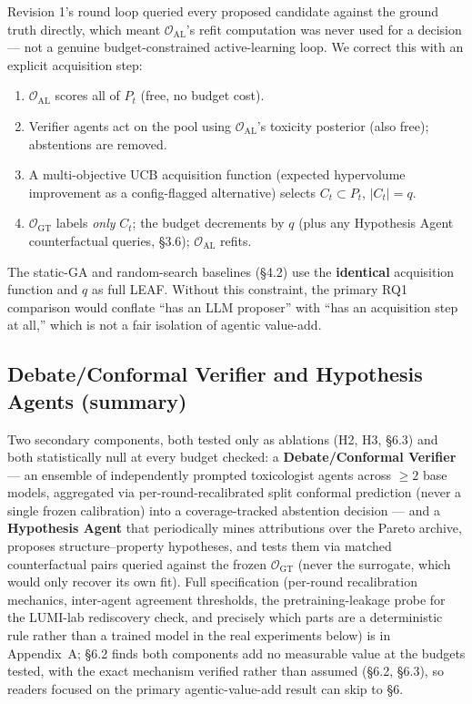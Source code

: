 \documentclass{article}
\begin{document}
Revision 1's round loop queried every proposed candidate against the
ground truth directly, which meant $\mathcal{O}_{\text{AL}}$'s refit
computation was never used for a decision --- not a genuine
budget-constrained active-learning loop. We correct this with an explicit
acquisition step:
\begin{enumerate}
\item $\mathcal{O}_{\text{AL}}$ scores all of $P_t$ (free, no budget cost).
\item Verifier agents act on the pool using $\mathcal{O}_{\text{AL}}$'s
toxicity posterior (also free); abstentions are removed.
\item A multi-objective UCB acquisition function (expected hypervolume
improvement as a config-flagged alternative) selects $C_t \subset P_t$,
$|C_t| = q$.
\item $\mathcal{O}_{\text{GT}}$ labels \emph{only} $C_t$; the budget
decrements by $q$ (plus any Hypothesis Agent counterfactual queries, \S3.6);
$\mathcal{O}_{\text{AL}}$ refits.
\end{enumerate}
The static-GA and random-search baselines (\S4.2) use the
\textbf{identical} acquisition function and $q$ as full LEAF. Without this
constraint, the primary RQ1 comparison would conflate ``has an LLM
proposer'' with ``has an acquisition step at all,'' which is not a fair
isolation of agentic value-add.

\subsection{Debate/Conformal Verifier and Hypothesis Agents (summary)}

Two secondary components, both tested only as ablations (H2, H3, \S6.3)
and both statistically null at every budget checked: a
\textbf{Debate/Conformal Verifier} --- an ensemble of independently
prompted toxicologist agents across $\ge2$ base models, aggregated via
per-round-recalibrated split conformal prediction (never a single frozen
calibration) into a coverage-tracked abstention decision --- and a
\textbf{Hypothesis Agent} that periodically mines attributions over the
Pareto archive, proposes structure--property hypotheses, and tests them
via matched counterfactual pairs queried against the frozen
$\mathcal{O}_{\text{GT}}$ (never the surrogate, which would only recover
its own fit). Full specification (per-round recalibration mechanics,
inter-agent agreement thresholds, the pretraining-leakage probe for the
LUMI-lab rediscovery check, and precisely which parts are a deterministic
rule rather than a trained model in the real experiments below) is in
Appendix~A; \S6.2 finds both components add no measurable value at the
budgets tested, with the exact mechanism verified rather than assumed
(\S6.2, \S6.3), so readers focused on the primary agentic-value-add
result can skip to \S6.
\end{document}
